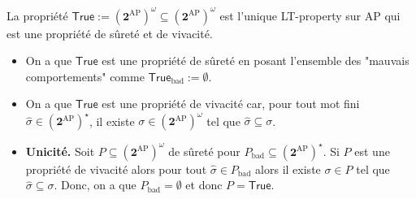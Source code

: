 \documentclass[./main]{subfiles}
\begin{document}
  \begin{prop}
    La propriété $\mathsf{True} := (\mathbf{2}^\mathrm{AP})^\omega \subseteq (\mathbf{2}^\mathrm{AP})^\omega$ est l'unique LT-property sur $\mathrm{AP}$ qui est une propriété de sûreté et de vivacité.
  \end{prop}
  \begin{prv}
    \begin{itemize}
      \item On a que $\mathsf{True}$ est une propriété de sûreté en posant l'ensemble des "mauvais comportements" comme $\mathsf{True}_\mathrm{bad} := \emptyset$.
      \item On a que $\mathsf{True}$ est une propriété de vivacité car, pour tout mot fini $\hat{\sigma} \in (\mathbf{2}^\mathrm{AP})^\star$, il existe $\sigma \in (\mathbf{2}^\mathrm{AP})^\omega$ tel que $\hat{\sigma} \subseteq \sigma$.
      \item \textbf{Unicité.}
        Soit $P \subseteq (\mathbf{2}^\mathrm{AP})^\omega$ de sûreté pour $P_\mathrm{bad} \subseteq (\mathbf{2}^\mathrm{AP})^\star$.
        Si $P$ est une propriété de vivacité alors pour tout $\hat{\sigma} \in P_\mathrm{bad}$ alors il existe $\sigma \in P$ tel que $\hat{\sigma} \subseteq \sigma$.
        Donc, on a que $P_\mathrm{bad} = \emptyset$ et donc $P = \mathsf{True}$.
    \end{itemize}
  \end{prv}
\end{document}
